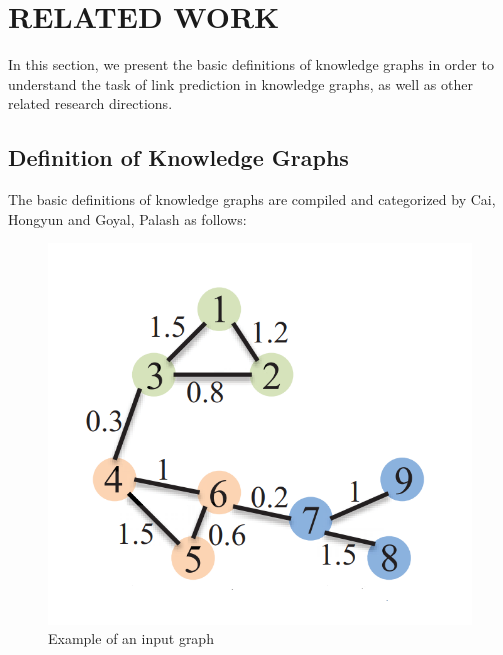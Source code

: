 
\chapter{RELATED WORK}
\label{chap:RelatedWork}

In this section, we present the basic definitions of knowledge graphs in order to understand the task of link prediction in knowledge graphs, as well as other related research directions.

\section{Definition of Knowledge Graphs}

The basic definitions of knowledge graphs are compiled and categorized by Cai, Hongyun \cite{cai2018comprehensive} and Goyal, Palash \cite{goyal2018graph} as follows:

\begin{figure}[htp]
	\centering
	\includegraphics[width=7 cm]{images/graph_emb_1.png}
	\caption{Example of an input graph}
	\label{fig:graphInput}
\end{figure}

